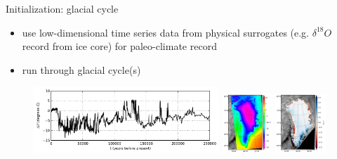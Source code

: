 \documentclass[hide notes,intlimits]{beamer}
\begin{document}
\begin{frame}{Initialization: glacial cycle}
  \begin{figure} \footnotesize
  \end{figure}
  \begin{itemize}
  \item use low-dimensional time series data from physical surrogates (e.g. $\delta ^{18}O$ record from ice core) for paleo-climate record
  \item run through glacial cycle(s)
  \end{itemize}
  \begin{figure}
    \includegraphics[height=2.5cm]{gripDeltaT}
    \includegraphics[height=2.25cm]{t2m_racmo_clrun_baseline}
    \includegraphics[height=2.25cm]{cmb_racmo_clrun_baseline}
      \end{figure}
\end{frame}
\end{document}
